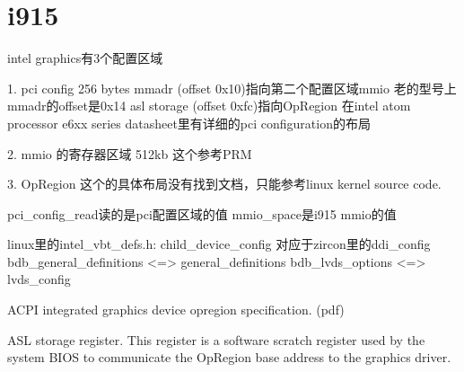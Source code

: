 \section{i915}
intel graphics有3个配置区域

1. pci config 256 bytes
   mmadr (offset 0x10)指向第二个配置区域mmio  老的型号上mmadr的offset是0x14
   asl storage (offset 0xfc)指向OpRegion
   在intel atom processor e6xx series datasheet里有详细的pci configuration的布局

2. mmio 的寄存器区域 512kb
  这个参考PRM

3. OpRegion
  这个的具体布局没有找到文档，只能参考linux kernel source code.


pci_config_read读的是pci配置区域的值
mmio_space是i915 mmio的值


linux里的intel_vbt_defs.h: 
child_device_config 对应于zircon里的ddi_config
bdb_general_definitions <=> general_definitions
bdb_lvds_options <=> lvds_config


ACPI integrated graphics device opregion specification. (pdf)

ASL storage register. This register is a software scratch register used by the
system BIOS to communicate the OpRegion base address to the graphics driver.

